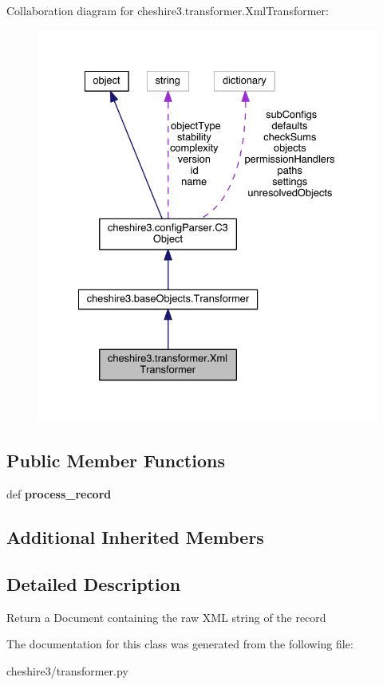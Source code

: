 Collaboration diagram for cheshire3.\-transformer.\-Xml\-Transformer\-:
\nopagebreak
\begin{figure}[H]
\begin{center}
\leavevmode
\includegraphics[width=331pt]{classcheshire3_1_1transformer_1_1_xml_transformer__coll__graph}
\end{center}
\end{figure}
\subsection*{Public Member Functions}
\begin{DoxyCompactItemize}
\item 
\hypertarget{classcheshire3_1_1transformer_1_1_xml_transformer_a25b2514860394e4541646b298ed1fe33}{def {\bfseries process\-\_\-record}}\label{classcheshire3_1_1transformer_1_1_xml_transformer_a25b2514860394e4541646b298ed1fe33}

\end{DoxyCompactItemize}
\subsection*{Additional Inherited Members}


\subsection{Detailed Description}
\begin{DoxyVerb}Return a Document containing the raw XML string of the record \end{DoxyVerb}
 

The documentation for this class was generated from the following file\-:\begin{DoxyCompactItemize}
\item 
cheshire3/transformer.\-py\end{DoxyCompactItemize}
